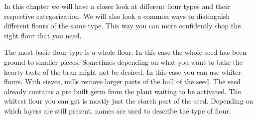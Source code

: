 In this chapter we will have a closer look at different flour types
and their respective categorization. We will also look a common
ways to distinguish different flours of the same type. This way you can more confidently
shop the right flour that you need.

The most basic flour type is a whole flour. In this case the whole seed has
been ground to smaller pieces. Sometimes depending on what you want to bake
the hearty taste of the bran might not be desired. In this case you can use
whiter flours. With sieves, mills remove larger parts of the hull of the seed.
The seed already contains a pre built germ from the plant waiting to be
activated. The whitest flour you can get is mostly just the starch part of the seed.
Depending on which layers are still present, names are used to describe the
type of flour.

\begin{table}[htb!]
\centering
{}
\caption{\label{tab:flour-types-comparison}A comparison of the different wheat flour types}
\end{table}

